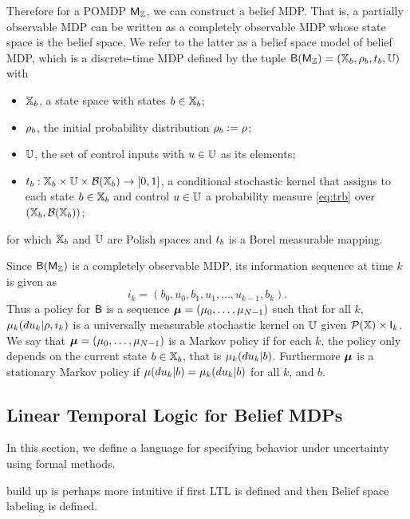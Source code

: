 \documentclass{ifacconf}
\newcommand{\red}[1]{{\color{red} #1}}
\begin{document}
Therefore for a POMDP $\mathsf{M}_{{\mathbb{Z}}}$, we can construct a belief MDP. 
 That is, a partially observable MDP can be written as a completely observable MDP whose state space is the belief space. We refer to the latter as a belief space model of belief MDP, which is a
discrete-time MDP defined by the tuple $\mathsf{B}(\mathsf{M}_{{\mathbb{Z}}}) = ({{\mathbb{X}}_b}, \rho_b, t_b, {\mathbb{U}})$ with
  \begin{itemize}
    \item ${{\mathbb{X}}_b}$,  a state space with states $b\in{{\mathbb{X}}_b}$; %
    \item $\rho_b$, the initial probability distribution $\rho_b:=\rho$;
    \item ${\mathbb{U}}$, the set of control inputs with $u\in{\mathbb{U}}$ as its elements;
    \item $t_b:{{\mathbb{X}}_b}\times{\mathbb{U}}\times\mathcal B({{\mathbb{X}}_b})\rightarrow[0,1]$, a conditional stochastic kernel that assigns to each state $b\in {{\mathbb{X}}_b}$ and control $u\in {\mathbb{U}}$ a probability measure \eqref{eq:trb} over $({{\mathbb{X}}_b},\mathcal B({{\mathbb{X}}_b}))$;
  \end{itemize}
  for which ${{\mathbb{X}}_b}$ and ${\mathbb{U}}$ are  Polish spaces \citep{bertsekas2004stochastic} and $t_b$ is a Borel measurable mapping.

Since $\mathsf{B}(\mathsf{M}_{{\mathbb{Z}}})$ is a completely observable MDP, its information sequence at time $k$ is given as  
\[i_k=(b_0, u_0, b_1, u_1, \ldots, u_{k-1},b_k).\]
Thus	a policy for $\mathsf{B}$ is a sequence ${\boldsymbol{\mu}}=({\mu}_0,\ldots,{\mu}_{N-1})$ such that  for all $k$, ${\mu}_k(du_k|\rho, i_k)$ is a universally measurable stochastic kernel on ${\mathbb{U}}$  given $\mathcal{P}({\mathbb{X}})\times {\mathsf{I}}_k$.
	We say that ${\boldsymbol{\mu}}=({\mu}_0,\ldots,{\mu}_{N-1})$ is a Markov policy if for each $k$, the policy only depends on the current state $b\in{{\mathbb{X}}_b}$, that is ${\mu}_k(du_k|b)$.
	Furthermore 	 ${\boldsymbol{\mu}}$ is a stationary Markov policy if ${\mu}(du_k|b)= {\mu}_k(du_k|b)$ for all $k$, and $b$.
	
	

\subsection{Linear Temporal Logic for Belief MDPs}

	In this section, we define a language for specifying behavior under uncertainty using formal methods. 
 
 \red{build up is perhaps more intuitive if first LTL is defined and then Belief space labeling is defined.}
	
\end{document}
